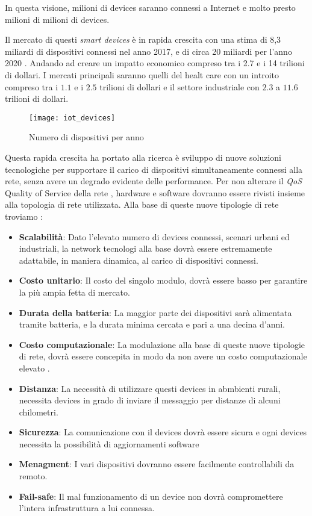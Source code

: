 In questa visione, milioni di devices saranno connessi a Internet e molto presto
milioni di milioni di devices. 

Il mercato di questi \emph{smart devices } è
in rapida crescita con una stima di 8,3 miliardi di dispositivi connessi nel
anno 2017, e di circa 20 miliardi per l'anno 2020 \cite{gartner2016}. Andando ad
creare un impatto economico compreso tra i 2.7 e i 14 trilioni di dollari. I
mercati principali saranno quelli del healt care con un introito compreso tra i
$1.1$ e i $2.5$ trilioni di dollari e il settore industriale con $2.3$ a $11.6$
trilioni di dollari.

\begin{figure}[h]
\centering 
\texttt{[image: iot\_devices]}
\caption{Numero di dispositivi per anno}
\end{figure}

Questa rapida crescita ha portato alla ricerca è sviluppo di nuove soluzioni 
tecnologiche per supportare il carico di dispositivi simultaneamente connessi 
alla rete, senza avere un degrado evidente delle performance.
Per non alterare il \emph{QoS} Quality of Service della rete , hardware e
software dovranno essere rivisti insieme alla topologia di rete utilizzata. Alla
base di queste nuove tipologie di rete troviamo :

\begin{itemize}
\item \textbf{Scalabilità}: Dato l'elevato numero di devices connessi, scenari
urbani ed industriali, la network tecnologi alla base dovrà essere estremamente
adattabile, in maniera dinamica, al carico di dispositivi connessi.
\item \textbf{Costo unitario}: Il costo del singolo modulo, dovrà essere basso
per garantire la più ampia fetta di mercato.
\item \textbf{Durata della batteria}: La maggior parte dei dispositivi sarà
alimentata tramite batteria, e la durata minima cercata e pari a una decina d'anni. 
\item \textbf{Costo computazionale}: La modulazione alla base di queste nuove
tipologie di rete, dovrà essere concepita in modo da non avere un costo
computazionale elevato .
\item \textbf{Distanza}: La necessità di utilizzare questi devices in abmbienti
rurali, necessita devices in grado di inviare il messaggio per distanze di
alcuni chilometri.
\item \textbf{Sicurezza}: La comunicazione con il devices dovrà essere sicura e
ogni devices necessita la possibilità di aggiornamenti software
\item \textbf{Menagment}: I vari dispositivi dovranno essere facilmente
controllabili da remoto.
\item \textbf{Fail-safe}: Il mal  funzionamento di un  device non dovrà
compromettere l'intera infrastruttura a lui connessa. 
\end{itemize}


